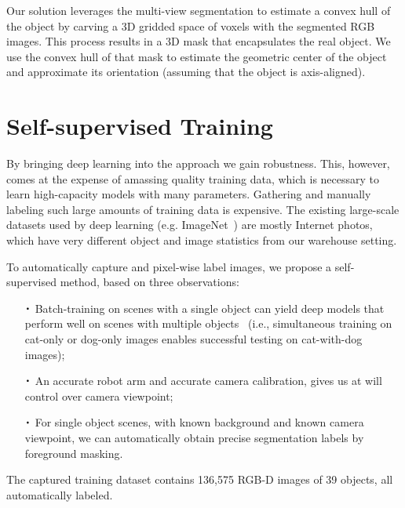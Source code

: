 \documentclass[letterpaper, 10 pt, conference]{ieeeconf}  %
\newcommand*{\Cdot}{\raisebox{-0.25ex}{\scalebox{1.75}{$\cdot$}}}
\begin{document}
Our solution leverages the multi-view segmentation to estimate a convex hull of the object by carving a 3D gridded space of voxels with the segmented RGB images. This process results in a 3D mask that encapsulates the real object. We use the convex hull of that mask to estimate the geometric center of the object and approximate its orientation (assuming that the object is axis-aligned).



\section{Self-supervised Training}
By bringing deep learning into the approach we gain robustness. This, however, comes at the expense of amassing quality training data, which is necessary to learn high-capacity models with many parameters.
Gathering and manually labeling such large amounts of training data is expensive. The existing large-scale datasets used by deep learning (e.g. ImageNet~\cite{ILSVRC15}) are mostly Internet photos, which have very different object and image statistics from our warehouse setting.

To automatically capture and pixel-wise label images, we propose a self-supervised method, based on three observations: 
\begin{itemize}
\item[$\Cdot$] Batch-training on scenes with a single object can yield deep models that perform well on scenes with multiple objects~\cite{girshick2014rich} (i.e., simultaneous training on cat-only or dog-only images enables successful testing on cat-with-dog images); 
\item[$\Cdot$] An accurate robot arm and accurate camera calibration, gives us at will control over camera viewpoint;
\item[$\Cdot$] For single object scenes, with known background and known camera viewpoint, we can automatically obtain precise segmentation labels by foreground masking.
\end{itemize}
The captured training dataset contains 136,575 RGB-D images of 39 objects, all automatically labeled.
\end{document}
